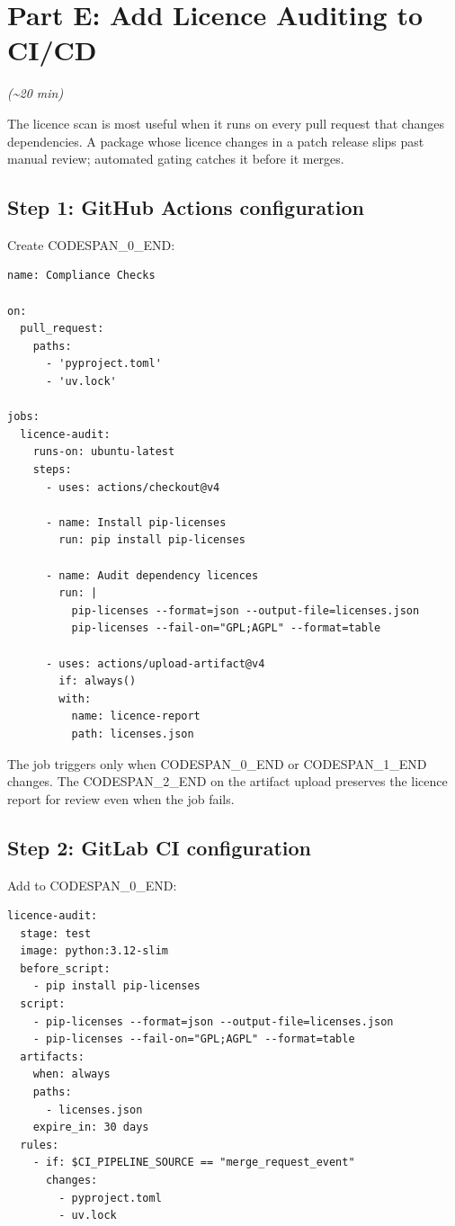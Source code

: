 \documentclass[11pt,a4paper]{book}
\begin{document}
\medskip

\section{Part E: Add Licence Auditing to CI/CD}

\textit{(\textasciitilde{}20 min)}

The licence scan is most useful when it runs on every pull request that changes dependencies. A package whose licence changes in a patch release slips past manual review; automated gating catches it before it merges.

\subsection{Step 1: GitHub Actions configuration}

Create CODESPAN\_0\_END:

\begin{lstlisting}
name: Compliance Checks

on:
  pull_request:
    paths:
      - 'pyproject.toml'
      - 'uv.lock'

jobs:
  licence-audit:
    runs-on: ubuntu-latest
    steps:
      - uses: actions/checkout@v4

      - name: Install pip-licenses
        run: pip install pip-licenses

      - name: Audit dependency licences
        run: |
          pip-licenses --format=json --output-file=licenses.json
          pip-licenses --fail-on="GPL;AGPL" --format=table

      - uses: actions/upload-artifact@v4
        if: always()
        with:
          name: licence-report
          path: licenses.json
\end{lstlisting}

The job triggers only when CODESPAN\_0\_END or CODESPAN\_1\_END changes. The CODESPAN\_2\_END on the artifact upload preserves the licence report for review even when the job fails.

\subsection{Step 2: GitLab CI configuration}

Add to CODESPAN\_0\_END:

\begin{lstlisting}
licence-audit:
  stage: test
  image: python:3.12-slim
  before_script:
    - pip install pip-licenses
  script:
    - pip-licenses --format=json --output-file=licenses.json
    - pip-licenses --fail-on="GPL;AGPL" --format=table
  artifacts:
    when: always
    paths:
      - licenses.json
    expire_in: 30 days
  rules:
    - if: $CI_PIPELINE_SOURCE == "merge_request_event"
      changes:
        - pyproject.toml
        - uv.lock
\end{lstlisting}
\end{document}
